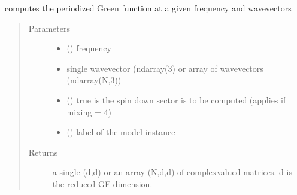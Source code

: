 \documentclass[letterpaper,10pt,english]{sphinxmanual}
\begin{document}

\begin{fulllineitems}
\label{\detokenize{functions:pyqcm.periodized_Green_function}}
\sphinxAtStartPar
computes the periodized Green function at a given frequency and wavevectors
\begin{quote}\begin{description}
\item[{Parameters}] \leavevmode\begin{itemize}
\item {} 
\sphinxAtStartPar
{} () \textendash{} frequency

\item {} 
\sphinxAtStartPar
{} \textendash{} single wavevector (ndarray(3) or array of wavevectors (ndarray(N,3))

\item {} 
\sphinxAtStartPar
{} () \textendash{} true is the spin down sector is to be computed (applies if mixing = 4)

\item {} 
\sphinxAtStartPar
{} () \textendash{} label of the model instance

\end{itemize}

\item[{Returns}] \leavevmode
\sphinxAtStartPar
a single (d,d) or an array (N,d,d) of complex\sphinxhyphen{}valued matrices. d is the reduced GF dimension.

\end{description}\end{quote}

\end{fulllineitems}
\end{document}
